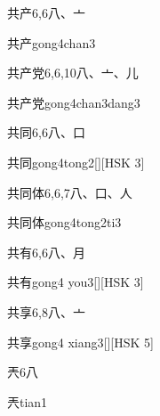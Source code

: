 \begin{entry}{共产}{6,6}{⼋、⼇}
  \begin{phonetics}{共产}{gong4chan3}
  \end{phonetics}
\end{entry}

\begin{entry}{共产党}{6,6,10}{⼋、⼇、⼉}
  \begin{phonetics}{共产党}{gong4chan3dang3}
  \end{phonetics}
\end{entry}

\begin{entry}{共同}{6,6}{⼋、⼝}
  \begin{phonetics}{共同}{gong4tong2}[][HSK 3]
  \end{phonetics}
\end{entry}

\begin{entry}{共同体}{6,6,7}{⼋、⼝、⼈}
  \begin{phonetics}{共同体}{gong4tong2ti3}
  \end{phonetics}
\end{entry}

\begin{entry}{共有}{6,6}{⼋、⽉}
  \begin{phonetics}{共有}{gong4 you3}[][HSK 3]
  \end{phonetics}
\end{entry}

\begin{entry}{共享}{6,8}{⼋、⼇}
  \begin{phonetics}{共享}{gong4 xiang3}[][HSK 5]
  \end{phonetics}
\end{entry}

\begin{entry}{兲}{6}{⼋}
  \begin{phonetics}{兲}{tian1}
  \end{phonetics}
\end{entry}

